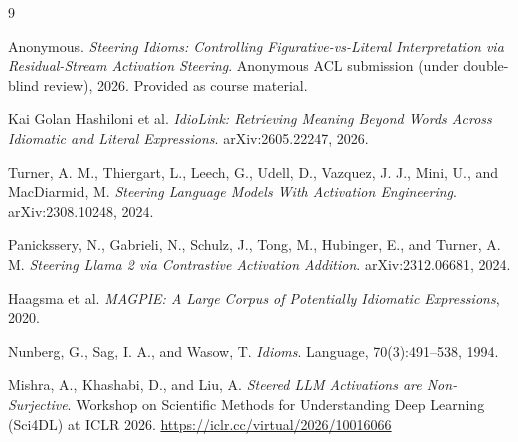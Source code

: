 \documentclass[11pt]{article}
\begin{document}

\begin{thebibliography}{9}

Anonymous.
\emph{Steering Idioms: Controlling Figurative-vs-Literal Interpretation via
Residual-Stream Activation Steering}.
Anonymous ACL submission (under double-blind review), 2026. Provided as course
material.

Kai Golan Hashiloni et al.
\emph{IdioLink: Retrieving Meaning Beyond Words Across Idiomatic and Literal
Expressions}.
arXiv:2605.22247, 2026.

Turner, A. M., Thiergart, L., Leech, G., Udell, D., Vazquez, J. J., Mini, U., and
MacDiarmid, M.
\emph{Steering Language Models With Activation Engineering}.
arXiv:2308.10248, 2024.

Panickssery, N., Gabrieli, N., Schulz, J., Tong, M., Hubinger, E., and Turner, A. M.
\emph{Steering Llama 2 via Contrastive Activation Addition}.
arXiv:2312.06681, 2024.

Haagsma et al.
\emph{MAGPIE: A Large Corpus of Potentially Idiomatic Expressions}, 2020.

Nunberg, G., Sag, I. A., and Wasow, T.
\emph{Idioms}.
Language, 70(3):491--538, 1994.

Mishra, A., Khashabi, D., and Liu, A.
\emph{Steered LLM Activations are Non-Surjective}.
Workshop on Scientific Methods for Understanding Deep Learning (Sci4DL) at ICLR 2026.
\url{https://iclr.cc/virtual/2026/10016066}

\end{thebibliography}
\end{document}
